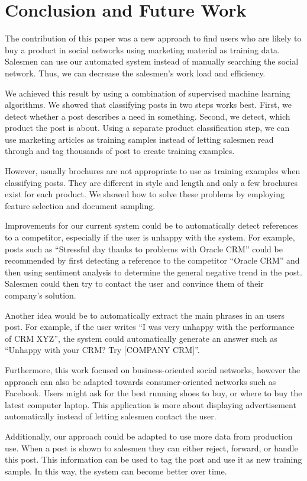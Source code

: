\section{Conclusion and Future Work}
\label{sec:conclusion}

The contribution of this paper was a new approach to find users who are likely to buy a product in social networks using marketing material as training data.
Salesmen can use our automated system instead of manually searching the social network.
Thus, we can decrease the salesmen's work load and efficiency.

We achieved this result by using a combination of supervised machine learning algorithms.
We showed that classifying posts in two steps works best.
First, we detect whether a post describes a need in something.
Second, we detect, which product the post is about.
Using a separate product classification step, we can use marketing articles as training samples instead of letting salesmen read through and tag thousands of post to create training examples.

However, usually brochures are not appropriate to use as training examples when classifying posts.
They are different in style and length and only a few brochures exist for each product.
We showed how to solve these problems by employing feature selection and document sampling.

Improvements for our current system could be to automatically detect references to a competitor, especially if the user is unhappy with the system.
For example, posts such as ``Stressful day thanks to problems with Oracle CRM'' could be recommended by first detecting a reference to the competitor ``Oracle CRM'' and then using sentiment analysis to determine the general negative trend in the post.
Salesmen could then try to contact the user and convince them of their company's solution.

Another idea would be to automatically extract the main phrases in an users post.
For example, if the user writes ``I was very unhappy with the performance of CRM XYZ'', the system could automatically generate an answer such as ``Unhappy with your CRM? Try [COMPANY CRM]''.

Furthermore, this work focused on business-oriented social networks, however the approach can also be adapted towards consumer-oriented networks such as Facebook.
Users might ask for the best running shoes to buy, or where to buy the latest computer laptop.
This application is more about displaying advertisement automatically instead of letting salesmen contact the user.

Additionally, our approach could be adapted to use more data from production use.
When a post is shown to salesmen they can either reject, forward, or handle this post.
This information can be used to tag the post and use it as new training sample.
In this way, the system can become better over time.
